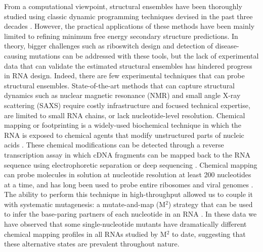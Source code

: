 \documentclass[12pt]{article}
\begin{document}
From a computational viewpoint, structural ensembles have been thoroughly studied using classic dynamic programming techniques devised in the past three decades \cite{McCaskill,Ding2005b}. 
However, the practical applications of  these methods have been mainly limited to refining minimum free energy secondary structure predictions. 
In theory, bigger challenges such as riboswitch design and detection of disease-causing mutations can be addressed with these tools, but the lack of experimental data that can validate the estimated structural ensembles has hindered progress in RNA design. 
Indeed, there are few experimental techniques that can probe structural ensembles. 
State-of-the-art methods that can capture structural dynamics such as nuclear magnetic resonance (NMR) \cite{Bothe2011} and small angle X-ray scattering (SAXS) \cite{Russell2002,Wang2009} require costly infrastructure and focused technical expertise, are limited to small RNA chains, or lack nucleotide-level resolution. 
Chemical mapping or footprinting is a widely-used biochemical technique in which the RNA is exposed to chemical agents that modify unstructured parts of nucleic acids \cite{Mortimer2007,Tijerina2007}. 
These chemical modifications can be detected through a reverse transcription assay in which cDNA fragments can be mapped back to the RNA sequence using electrophoretic separation or deep sequencing \cite{Mitra2008,Lucks2011}. 
Chemical mapping can probe molecules in solution at nucleotide resolution at least 200 nucleotides at a time, and has long been used to probe entire ribosomes and viral genomes \cite{Noller, Wilkinson2008,Watts2009}. 
The ability to perform this technique in high-throughput allowed us to couple it with systematic mutagenesis: a mutate-and-map (M$^2$) strategy that can be used to infer the base-paring partners of each nucleotide in an RNA \cite{Kladwang2011,Kladwang2011f}. 
In these data we have observed that some single-nucleotide mutants have dramatically different chemical mapping profiles in all RNAs studied by M$^2$ to date, suggesting that these alternative states are prevalent throughout nature.
\end{document}
